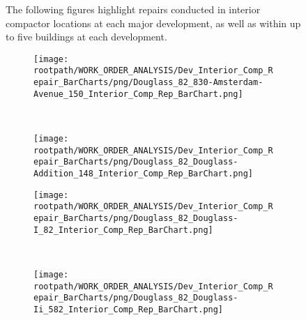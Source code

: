 \begin{figure}[h]
                                \raggedright
                                \sf
                                The following figures highlight repairs conducted in interior compactor locations at each major development, as well as within up to five buildings at each development.\\
                                \begin{subfigure}{0.45\textwidth}
                                        \texttt{[image: \\rootpath/WORK\_ORDER\_ANALYSIS/Dev\_Interior\_Comp\_Repair\_BarCharts/png/Douglass\_82\_830-Amsterdam-Avenue\_150\_Interior\_Comp\_Rep\_BarChart.png]}
                                        \end{subfigure}
                                        ~
                                        \begin{subfigure}{0.45\textwidth}
                                        \texttt{[image: \\rootpath/WORK\_ORDER\_ANALYSIS/Dev\_Interior\_Comp\_Repair\_BarCharts/png/Douglass\_82\_Douglass-Addition\_148\_Interior\_Comp\_Rep\_BarChart.png]}
                                        \end{subfigure}
                                        
                                        \begin{subfigure}{0.45\textwidth}
                                        \texttt{[image: \\rootpath/WORK\_ORDER\_ANALYSIS/Dev\_Interior\_Comp\_Repair\_BarCharts/png/Douglass\_82\_Douglass-I\_82\_Interior\_Comp\_Rep\_BarChart.png]}
                                        \end{subfigure}
                                        ~
                                        \begin{subfigure}{0.45\textwidth}
                                        \texttt{[image: \\rootpath/WORK\_ORDER\_ANALYSIS/Dev\_Interior\_Comp\_Repair\_BarCharts/png/Douglass\_82\_Douglass-Ii\_582\_Interior\_Comp\_Rep\_BarChart.png]}
                                        \end{subfigure}
                                        
                                        
\end{figure}
